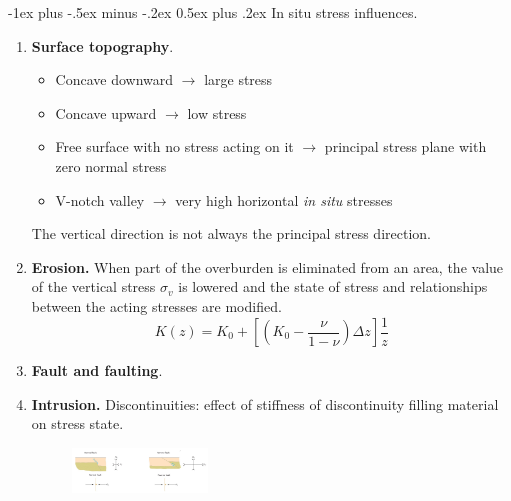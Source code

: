 \documentclass[10pt,landscape,a4paper]{article}
\makeatletter
\renewcommand{\section}{\@startsection{section}{1}{0mm}%
	{-1ex plus -.5ex minus -.2ex}%
	{0.5ex plus .2ex}%
	{\normalfont\large\bfseries}}
\makeatother
\begin{document}
\begin{multicols}{3}
	\section{In situ stress influences.}
	\begin{enumerate}
		\item \textbf{Surface topography}.
		      \begin{itemize}
			      \item Concave downward $\to$ large stress
			      \item Concave upward $\to$ low stress
			      \item Free surface with no stress acting on it $\to$ principal stress plane with zero normal stress
			      \item V-notch valley $\to$ very high horizontal \textit{in situ} stresses
		      \end{itemize}
		      The vertical direction is not always the principal stress direction.
		\item \textbf{Erosion.} When part of the overburden is eliminated from an area, the value of the vertical stress $\sigma_v$ is lowered and the state of stress and relationships between the acting stresses are modified.
		      \[
			      K(z)=K_0+\left[\left(K_0-\frac{\nu}{1-\nu}\right)\Delta z\right]\frac{1}{z}
		      \]
		\item \textbf{Fault and faulting}.
		\item \textbf{Intrusion.} Discontinuities: effect of stiffness of discontinuity filling material on stress state.
		      \begin{figure}[H]
			      \centering
			      \includegraphics[width=0.34\textwidth]{fault-and-faulting}
		      \end{figure}
	\end{enumerate}
	

\end{multicols}
\end{document}
